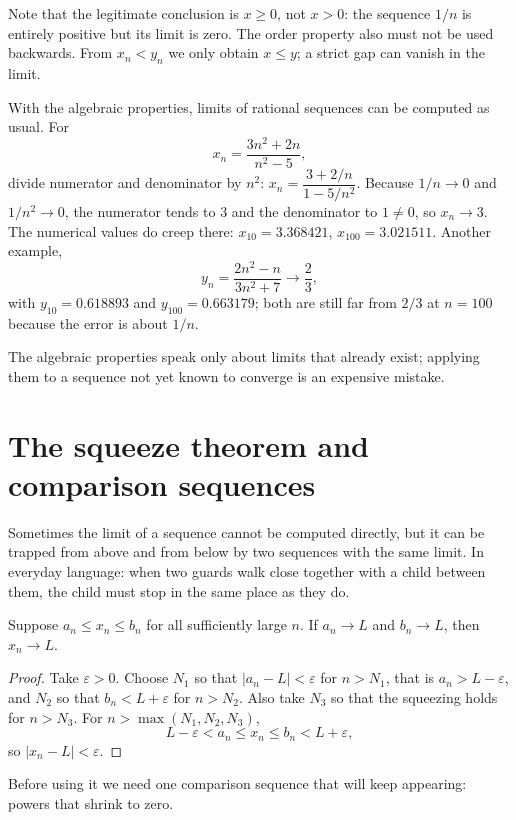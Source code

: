 Note that the legitimate conclusion is $x \ge 0$, not $x>0$: the sequence $1/n$ is
entirely positive but its limit is zero. The order property also must not be used
backwards. From $x_n<y_n$ we only obtain $x \le y$; a strict gap can vanish in the
limit.

With the algebraic properties, limits of rational sequences can be computed as
usual. For
\[
x_n=\frac{3n^2+2n}{n^2-5},
\]
divide numerator and denominator by $n^2$:
$x_n=\dfrac{3+2/n}{1-5/n^2}$. Because $1/n \to 0$ and $1/n^2 \to 0$, the numerator
tends to $3$ and the denominator to $1 \neq 0$, so $x_n \to 3$. The numerical values
do creep there: $x_{10}=3.368421$, $x_{100}=3.021511$. Another example,
\[
y_n=\frac{2n^2-n}{3n^2+7} \longrightarrow \frac{2}{3},
\]
with $y_{10}=0.618893$ and $y_{100}=0.663179$; both are still far from $2/3$ at
$n=100$ because the error is about $1/n$.

The algebraic properties speak only about limits that already exist; applying them
to a sequence not yet known to converge is an expensive mistake.

\section{The squeeze theorem and comparison sequences}

Sometimes the limit of a sequence cannot be computed directly, but it can be trapped
from above and from below by two sequences with the same limit. In everyday
language: when two guards walk close together with a child between them, the child
must stop in the same place as they do.

\begin{teorema}
Suppose $a_n \le x_n \le b_n$ for all sufficiently large $n$. If
$a_n \to L$ and $b_n \to L$, then $x_n \to L$.
\end{teorema}

\begin{proof}
Take $\varepsilon>0$. Choose $N_1$ so that $|a_n-L|<\varepsilon$ for $n>N_1$, that
is $a_n>L-\varepsilon$, and $N_2$ so that $b_n<L+\varepsilon$ for $n>N_2$. Also take
$N_3$ so that the squeezing holds for $n>N_3$. For $n>\max(N_1,N_2,N_3)$,
\[
L-\varepsilon < a_n \le x_n \le b_n < L+\varepsilon,
\]
so $|x_n-L|<\varepsilon$.
\end{proof}

Before using it we need one comparison sequence that will keep appearing: powers that
shrink to zero.

